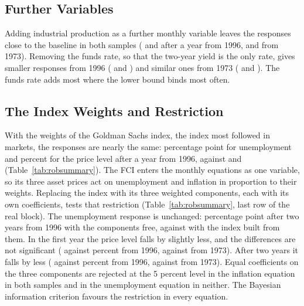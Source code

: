 \documentclass[11pt]{article}
\begin{document}
\subsection{Further Variables}\label{sec:extensions}
Adding industrial production as a further monthly variable leaves the responses close to the baseline in both samples ( and  after a year from 1996,  and  from 1973). Removing the funds rate, so that the two-year yield is the only rate, gives smaller responses from 1996 ( and ) and similar ones from 1973 ( and ). The funds rate adds most where the lower bound binds most often.

\subsection{The Index Weights and Restriction}\label{sec:restriction}
With the weights of the Goldman Sachs index, the index most followed in markets, the responses are nearly the same:  percentage point for unemployment and  percent for the price level after a year from 1996, against  and  (Table~\ref{tab:robsummary}). The FCI enters the monthly equations as one variable, so its three asset prices act on unemployment and inflation in proportion to their weights. Replacing the index with its three weighted components, each with its own coefficients, tests that restriction (Table~\ref{tab:robsummary}, last row of the real block). The unemployment response is unchanged:  percentage point after two years from 1996 with the components free, against  with the index built from them. In the first year the price level falls by slightly less, and the differences are not significant ( against  percent from 1996,  against  from 1973). After two years it falls by less ( against  percent from 1996,  against  from 1973). Equal coefficients on the three components are rejected at the 5 percent level in the inflation equation in both samples and in the unemployment equation in neither. The Bayesian information criterion favours the restriction in every equation.
\end{document}
